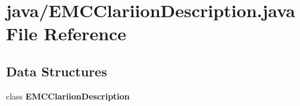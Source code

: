 \section{java/\-E\-M\-C\-Clariion\-Description.java File Reference}
\label{EMCClariionDescription_8java}
\subsection*{Data Structures}
\begin{DoxyCompactItemize}
\item 
class {\bf E\-M\-C\-Clariion\-Description}
\end{DoxyCompactItemize}
